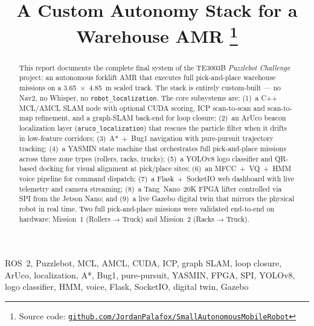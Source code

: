 \documentclass[conference]{IEEEtran}
\begin{document}
\title{A Custom Autonomy Stack for a Warehouse AMR%
\thanks{Source code:
\href{https://github.com/JordanPalafox/SmallAutonomousMobileRobot}{%
\texttt{github.com/JordanPalafox/SmallAutonomousMobileRobot}}}}

\author{
}
\maketitle

\begin{abstract}
This report documents the complete final system of the TE3003B
\textit{Puzzlebot Challenge} project: an autonomous forklift AMR that
executes full pick-and-place warehouse missions on a \mbox{3.65 × 4.85 m}
scaled track. The stack is entirely custom-built --- no Nav2, no Whisper,
no \texttt{robot\_localization}. The core subsystems are:
(1)~a C++ MCL/AMCL SLAM node with optional CUDA scoring, ICP
scan-to-scan and scan-to-map refinement, and a graph-SLAM back-end for
loop closure;
(2)~an ArUco beacon localization layer (\texttt{aruco\_localization}) that
rescues the particle filter when it drifts in low-feature corridors;
(3)~A*~+~Bug1 navigation with pure-pursuit trajectory tracking;
(4)~a YASMIN state machine that orchestrates full pick-and-place missions
across three zone types (rollers, racks, trucks);
(5)~a YOLOv8 logo classifier and QR-based docking for visual alignment at
pick/place sites;
(6)~an MFCC~+~VQ~+~HMM voice pipeline for command dispatch;
(7)~a Flask~+~SocketIO web dashboard with live telemetry and camera
streaming;
(8)~a Tang~Nano~20K FPGA lifter controlled via SPI from the Jetson Nano;
and (9)~a live Gazebo digital twin that mirrors the physical robot in
real time.
Two full pick-and-place missions were validated end-to-end on hardware:
Mission~1 (Rollers → Truck) and Mission~2 (Racks → Truck).
\end{abstract}

\begin{IEEEkeywords}
ROS~2, Puzzlebot, MCL, AMCL, CUDA, ICP, graph SLAM, loop closure,
ArUco, localization, A*, Bug1, pure-pursuit, YASMIN, FPGA, SPI,
YOLOv8, logo classifier, HMM, voice, Flask, SocketIO, digital twin,
Gazebo
\end{IEEEkeywords}
\end{document}
